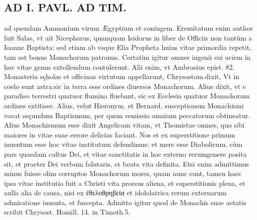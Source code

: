 \documentclass{article}
\begin{document}
\begin{pages}
\section*{AD I. PAVL. AD TIM. }
\marginpar{[ p.216 ]}\pstart ad quendam Ammonium virum Ægyptium et coniugem. Eremitatum enim author fuit Salas, vt ait Nicephorus, quanquam Isidorus in liber  de Officiis non tantùm a Ioanne Baptista: sed etiam ab vsque Elia Propheta huius vitae primordia repetit, tam est bonus Monachorum patronus. Certatim igitur omnes ingenii sui aciem in hoc vitae genus extollendum contulerunt. Alii enim, vt Ambrosius epist. 82. Monasteria sçholas et officinas virtutum appellarunt, Chrysostom.dixit, Vt in coelo sunt astra:sic in terra esse ordines diuersos Monachorum. Alius dixit, vt e paradiso terrestri quatuor flumina fluebant, sic ex Ecclesia quatuor Monachorum ordines extitisse. Alius, velut Hieronym. et Bernard. susceptionem Monachismi vocat seçundum Baptismum, per quem remissio omnium peccatorum obtineatur. Alius Monachismum esse dixit Angelicam vitam, vt Thomistae omnes, quo sibi maiores in vitae suae errore delicias faciant. Nos et ex superstitione primum inuentum esse hoc vitae institutum defendimus: et mere esse Diabolicum, cùm pars quaedam cultus Dei, et vitae sanctitatis in hoc externo rerumgenere posita sit, et praeter Dei verbum falutaris, et beata vita definita.  \pend\pstart Etsi enim admittimus minus fuisse olim corruptos Monachorum mores, quam nunc sunt, tamen haec ipsa vitae institutio fuit a Christi vita prorsus aliena, et superstitionis plena, et aulla alia de causa, nisi ex ἐθελοθρηβεία et idololatrica rerum externarum admiratione inuenta, et fuscepta. Admitto igitur quod de Monachis suae aetatis scribit Chrysost. Homill. 14. in Timoth.5.  \pend

\end{pages}
\end{document}
